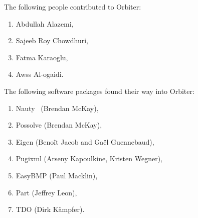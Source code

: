 The following people contributed to Orbiter:

\begin{enumerate}
\item
Abdullah Alazemi,
\item
Sajeeb Roy Chowdhuri,
\item
Fatma Karaoglu,
\item
Awss Al-ogaidi.
\end{enumerate}

\bigskip

The following software packages found their way into Orbiter:
\begin{enumerate}
\item
Nauty~\cite{Nauty2020} (Brendan McKay),
\item
Possolve (Brendan McKay),
\item
Eigen (Beno{\^i}t Jacob and Ga{\"e}l Guennebaud),
\item
Pugixml (Arseny Kapoulkine, Kristen Wegner),
\item
EasyBMP (Paul Macklin),
\item
Part (Jeffrey Leon),
\item
TDO (Dirk K\"ampfer).
\end{enumerate}
